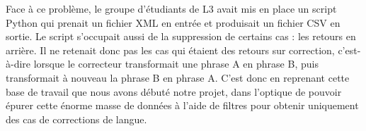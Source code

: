 \documentclass{article}
\begin{document}
\newline
\newline
Face \`{a} ce probl\`{e}me, le groupe d'\'{e}tudiants de L3 avait mis en place un script Python qui prenait un fichier XML en entr\'{e}e et produisait un fichier CSV en sortie. Le script s'occupait aussi de la suppression de certains cas : les retours en arri\`{e}re. Il ne retenait donc pas les cas qui \'{e}taient des retours sur correction, c'est-\`{a}-dire lorsque le correcteur transformait une phrase A en phrase B, puis transformait \`{a} nouveau la phrase B en phrase A.
\newline
\newline
C'est donc en reprenant cette base de travail que nous avons d\'{e}but\'{e} notre projet, dans l'optique de pouvoir \'{e}purer cette \'{e}norme masse de donn\'{e}es \`{a} l'aide de filtres pour obtenir uniquement des cas de corrections de langue.




\end{document}
